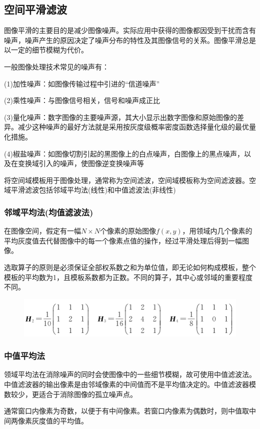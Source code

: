 \documentclass[11pt]{article}
\begin{document}
\subsection{空间平滑滤波}
图像平滑的主要目的是减少图像噪声。实际应用中获得的图像都因受到干扰而含有噪声，噪声产生的原因决定了噪声分布的特性及其图像信号的关系。图像平滑总是以一定的细节模糊为代价。

一般图像处理技术常见的噪声有：

(1)加性噪声：如图像传输过程中引进的“信道噪声”

(2)乘性噪声：与图像信号相关，信号和噪声成正比

(3)量化噪声：数字图像的主要噪声源，其大小显示出数字图像和原始图像的差异。减少这种噪声的最好方法就是采用按灰度级概率密度函数选择量化级的最优量化措施。

(4)椒盐噪声：如图像切割引起的黑图像上的白点噪声，白图像上的黑点噪声，以及在变换域引入的噪声，使图像逆变换噪声等

将空间域模板用于图像处理，通常称为空间滤波，空间域模板称为空间滤波器。空域平滑滤波包括邻域平均法(线性)和中值滤波法(非线性)

\subsubsection{邻域平均法(均值滤波法)}
在图像空间，假定有一幅$N\times N$个像素的原始图像$f(x,y)$，用领域内几个像素的平均灰度值去代替图像中的每一个像素点值的操作，经过平滑处理后得到一幅图像。

选取算子的原则是必须保证全部权系数之和为单位值，即无论如何构成模板，整个模板的平均数为1，且模板系数都为正数。不同的算子，其中心或邻域的重要程度不同。

\begin{figure}[H]
	\centering
	\includegraphics[scale=0.7]{26}
\end{figure}

\subsubsection{中值平均法}
领域平均法在消除噪声的同时会使图像中的一些细节模糊，故可使用中值滤波法。中值滤波器的输出像素是由邻域像素的中间值而不是平均值决定的。中值滤波器模数较少，更适合于消除图像的孤立噪声点。

通常窗口内像素为奇数，以便于有中间像素。若窗口内像素为偶数时，则中值取中间两像素灰度值的平均值。
\end{document}
